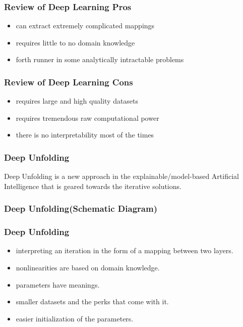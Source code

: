 
\begin{frame}
  \frametitle{Review of Deep Learning Pros}
  \begin{itemize}
    \pause
    \item can extract extremely complicated mappings
    \pause
    \item requires little to no domain knowledge
    \pause
    \item forth runner in some analytically intractable problems
  \end{itemize}
\end{frame}

\begin{frame}
  \frametitle{Review of Deep Learning Cons}
  \begin{itemize}
    \pause
    \item requires large and high quality datasets
    \pause
    \item requires tremendous raw computational power
    \pause
    \item there is no interpretability most of the times
  \end{itemize}
\end{frame}

\begin{frame}
  \frametitle{Deep Unfolding}
  \pause
  Deep Unfolding is a new approach in the explainable/model-based Artificial Intelligence 
  that is geared towards the iterative solutions.
\end{frame}

\begin{frame}
  \frametitle{Deep Unfolding(Schematic Diagram)}
  \begin{figure}
    \centering
    \resizebox{1.0\textwidth}{!}{}
    \label{fig:deep_unfolding}
  \end{figure}
\end{frame}

\begin{frame}
  \frametitle{Deep Unfolding}
  \begin{itemize}
    \pause
    \item interpreting an iteration in the form of a mapping between two layers. 
    \pause
    \item nonlinearities are based on domain knowledge.
    \pause
    \item parameters have meanings.
    \pause
    \item smaller datasets and the perks that come with it.
    \pause
    \item easier initialization of the parameters.
  \end{itemize}
\end{frame}
